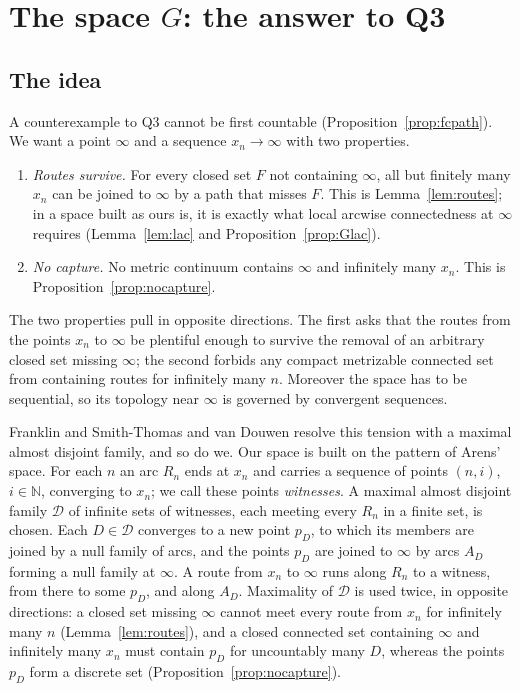 \documentclass[11pt]{amsart}
\theoremstyle{definition}
\theoremstyle{remark}
\newcommand{\N}{\mathbb{N}}
\newcommand{\cD}{\mathcal{D}}
\numberwithin{equation}{section}
\begin{document}
\section{The space \texorpdfstring{$G$}{G}: the answer to Q3}\label{sec:G}

\subsection{The idea}
A counterexample to Q3 cannot be first countable (Proposition~\ref{prop:fcpath}). We want a point $\infty$ and a sequence $x_n\to\infty$ with two properties.
\begin{enumerate}[label=\textup{(\roman*)},leftmargin=2.4em]
\item \emph{Routes survive.} For every closed set $F$ not containing $\infty$, all but finitely many $x_n$ can be joined to $\infty$ by a path that misses $F$. This is Lemma~\ref{lem:routes}; in a space built as ours is, it is exactly what local arcwise connectedness at $\infty$ requires (Lemma~\ref{lem:lac} and Proposition~\ref{prop:Glac}).
\item \emph{No capture.} No metric continuum contains $\infty$ and infinitely many $x_n$. This is Proposition~\ref{prop:nocapture}.
\end{enumerate}
The two properties pull in opposite directions. The first asks that the routes from the points $x_n$ to $\infty$ be plentiful enough to survive the removal of an arbitrary closed set missing $\infty$; the second forbids any compact metrizable connected set from containing routes for infinitely many $n$. Moreover the space has to be sequential, so its topology near $\infty$ is governed by convergent sequences.

Franklin and Smith-Thomas \cite{fst79} and van Douwen \cite{vandouwen81} resolve this tension with a maximal almost disjoint family, and so do we. Our space is built on the pattern of Arens' space. For each $n$ an arc $R_n$ ends at $x_n$ and carries a sequence of points $(n,i)$, $i\in\N$, converging to $x_n$; we call these points \emph{witnesses}. A maximal almost disjoint family $\cD$ of infinite sets of witnesses, each meeting every $R_n$ in a finite set, is chosen. Each $D\in\cD$ converges to a new point $p_D$, to which its members are joined by a null family of arcs, and the points $p_D$ are joined to $\infty$ by arcs $A_D$ forming a null family at $\infty$. A route from $x_n$ to $\infty$ runs along $R_n$ to a witness, from there to some $p_D$, and along $A_D$. Maximality of $\cD$ is used twice, in opposite directions: a closed set missing $\infty$ cannot meet every route from $x_n$ for infinitely many $n$ (Lemma~\ref{lem:routes}), and a closed connected set containing $\infty$ and infinitely many $x_n$ must contain $p_D$ for uncountably many $D$, whereas the points $p_D$ form a discrete set (Proposition~\ref{prop:nocapture}).
\end{document}
